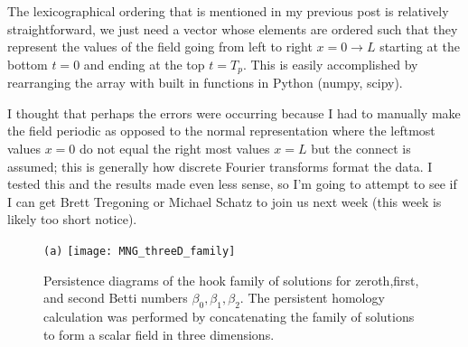 \begin{description}
{The lexicographical ordering that is mentioned in my previous post is relatively straightforward, we just need a vector whose elements are ordered
such that they represent the values of the field going from left to right $x=0\rightarrow L$ starting at the bottom $t=0$ and ending at the top $t=T_p$.
This is easily accomplished by rearranging the array with built in functions in Python (numpy, scipy).

I thought that perhaps the errors were occurring because I had to manually make the field periodic as opposed to the normal representation where
the leftmost values $x=0$ do not equal the right most values $x=L$ but the connect is assumed; this is generally how discrete Fourier transforms
format the data. I tested this and the results made even less sense, so I'm going to attempt to see if I can get Brett Tregoning or Michael Schatz to
join us next week (this week is likely too short notice).
}

\begin{figure}[ht]
\begin{minipage}[height=.32\textheight]{.8\textwidth}
\centering \small{\texttt{(a)}}
\texttt{[image: MNG\_threeD\_family]}
\end{minipage}
\caption{ \label{fig:MNG_threeD_family}
Persistence diagrams of the hook family of solutions for zeroth,first, and
second Betti numbers $\beta_0,\beta_1,\beta_2$. The persistent homology
calculation was performed by concatenating the family of solutions to form
a scalar field in three dimensions.
}
\end{figure}



\end{description}
